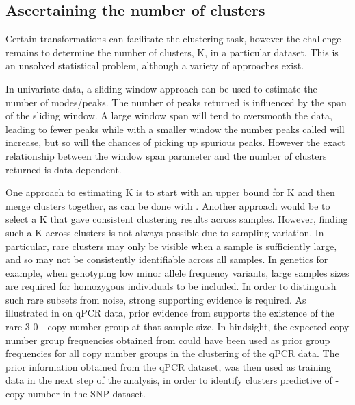 \subsection{Ascertaining the number of clusters}


Certain transformations can facilitate the clustering task, however the challenge remains to determine the number of clusters, K, in a particular dataset.
This is an unsolved statistical problem, although a variety of approaches exist.

In univariate data, a sliding window approach can be used to estimate the number of modes/peaks.
The number of peaks returned is influenced by the span of the sliding window.
A large window span will tend to oversmooth the data, leading to fewer peaks while with a smaller window the number peaks called will increase, but so will the chances of picking up spurious peaks.
However the exact relationship between the window span parameter and the number of clusters returned is data dependent.

One approach to estimating K is to start with an upper bound for K and then merge clusters together, as can be done with .
Another approach would be to select a K that gave consistent clustering results across samples.
However, finding such a K across clusters is not always possible due to sampling variation.
In particular, rare clusters may only be visible when a sample is sufficiently large, and so may not be consistently identifiable across all samples.
In genetics for example, when genotyping low minor allele frequency variants, large samples sizes are required for homozygous individuals to be included.
In order to distinguish such rare subsets from noise, strong supporting evidence is required.
As illustrated in  on qPCR data, prior evidence from \citet{Jiang:2012cf} supports the existence of the rare 3-0 - copy number group at that sample size.
In hindsight, the expected copy number group frequencies obtained from \citet{Jiang:2012cf} could have been used as prior group frequencies for all copy number groups in the clustering of the qPCR data.
The prior information obtained from the qPCR dataset, was then used as training data in the next step of the analysis, in order to identify clusters predictive of - copy number in the SNP dataset.

